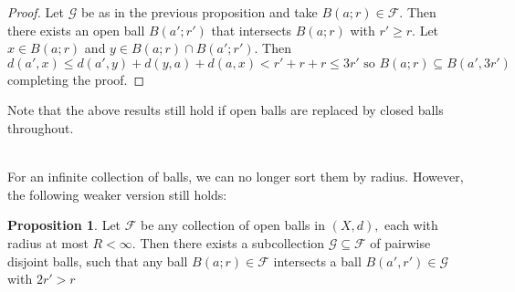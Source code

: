 \documentclass{article}
\theoremstyle{plain}
\theoremstyle{definition}
\newtheorem{prop}[thm]{Proposition}
\theoremstyle{remark}
\begin{document}
\begin{proof}
    Let $\mathcal{G}$ be as in the previous proposition and take $B(a; r) \in \mathcal{F}$. Then there exists an open ball $B(a'; r')$ that intersects $B(a;r)$ with $r' \ge r$. Let $x \in B(a;r)$ and $y \in B(a;r) \cap B(a';r')$. Then 
    \[d(a',x) \le d(a', y) + d(y,a) + d(a, x) < r' + r + r \le 3r' \text{ so } B(a;r) \subseteq B(a', 3r')\]completing the proof.
\end{proof}

Note that the above results still hold if open balls are replaced by closed balls throughout.

~\\For an infinite collection of balls, we can no longer sort them by radius. However, the following weaker version still holds:

\begin{prop}
    Let $\mathcal{F}$ be any collection of open balls in $(X,d), $ each with radius at most $R < \infty$. Then there exists a subcollection $\mathcal{G} \subseteq \mathcal{F}$ of pairwise disjoint balls, such that any ball $B(a;r) \in \mathcal{F}$ intersects a ball $B(a',r') \in \mathcal{G}$ with $2r' > r$
\end{prop}
\end{document}
